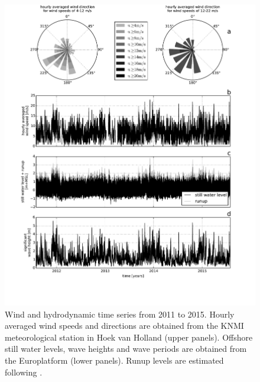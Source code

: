 \begin{figure}
  \centering
  \includegraphics[width=\columnwidth]{../Figures/boundaryconditions}
  \caption{Wind and hydrodynamic time series from 2011 to 2015. Hourly
    averaged wind speeds and directions are obtained from the KNMI
    meteorological station in Hoek van Holland (upper
    panels). Offshore still water levels, wave heights and wave
    periods are obtained from the Europlatform (lower panels). Runup
    levels are estimated following \citet{Stockdon2006}.}
  \label{fig:boundaryconditions}
\end{figure}

